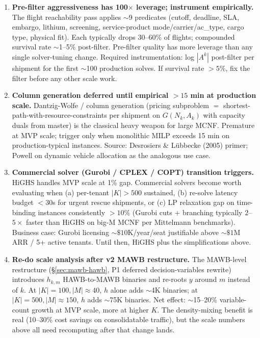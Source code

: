 \documentclass[11pt,a4paper]{article}
\theoremstyle{definition}
\begin{document}
\begin{enumerate}[resume]
  \item \label{item:strat-prefilter-instrumentation} \textbf{Pre-filter aggressiveness has 100$\times$ leverage; instrument empirically.}
        The flight reachability pass applies $\sim$9 predicates (cutoff, deadline, SLA,
        embargo, lithium, screening, service-product mode/carrier/ac\_type, cargo type,
        physical fit). Each typically drops 30--60\% of flights; compounded survival
        rate $\sim$1--5\% post-filter. Pre-filter quality has more leverage than any
        single solver-tuning change. Required instrumentation: log $|A^k|$ post-filter
        per shipment for the first $\sim$100 production solves. If survival rate
        $>5\%$, fix the filter before any other scale work.

  \item \label{item:strat-column-generation} \textbf{Column generation deferred until empirical $>15$ min at production scale.}
        Dantzig-Wolfe / column generation (pricing subproblem $=$ shortest-path-with-resource-constraints
        per shipment on $G(N_k, A_k)$ with capacity duals from master) is the classical
        heavy weapon for large MCNF. Premature at MVP scale; trigger only when monolithic
        MILP exceeds 15 min on production-typical instances. Source: Desrosiers \& Lübbecke
        (2005) primer; Powell on dynamic vehicle allocation as the analogous use case.

  \item \label{item:strat-commercial-solver} \textbf{Commercial solver (Gurobi / CPLEX / COPT) transition triggers.}
        HiGHS handles MVP scale at 1\% gap. Commercial solvers become worth evaluating
        when (a) per-tenant $|K| > 500$ sustained, (b) re-solve latency budget $<30$s for
        urgent rescue shipments, or (c) LP relaxation gap on time-binding instances
        consistently $>10\%$ (Gurobi cuts + branching typically $2$--$5\times$ faster
        than HiGHS on big-M MCNF per Mittelmann benchmarks). Business case: Gurobi
        licensing $\sim\$10$K/year/seat justifiable above $\sim\$1$M ARR / 5+ active
        tenants. Until then, HiGHS plus the simplifications above.

  \item \label{item:strat-v2-mawb-rescale} \textbf{Re-do scale analysis after v2 MAWB restructure.}
        The MAWB-level restructure (\S\ref{sec:mawb-hawb}, P1 deferred decision-variables
        rewrite) introduces $h_{k,m}$ HAWB-to-MAWB binaries and re-roots $y$ around $m$
        instead of $k$. At $|K|=100, |M|\approx 40$, $h$ alone adds $\sim$4K binaries;
        at $|K|=500, |M|\approx 150$, $h$ adds $\sim$75K binaries. Net effect:
        $\sim$15--20\% variable-count growth at MVP scale, more at higher $K$. The
        density-mixing benefit is real (10--30\% cost savings on consolidatable
        traffic), but the scale numbers above all need recomputing after that change
        lands.


\end{enumerate}
\end{document}
